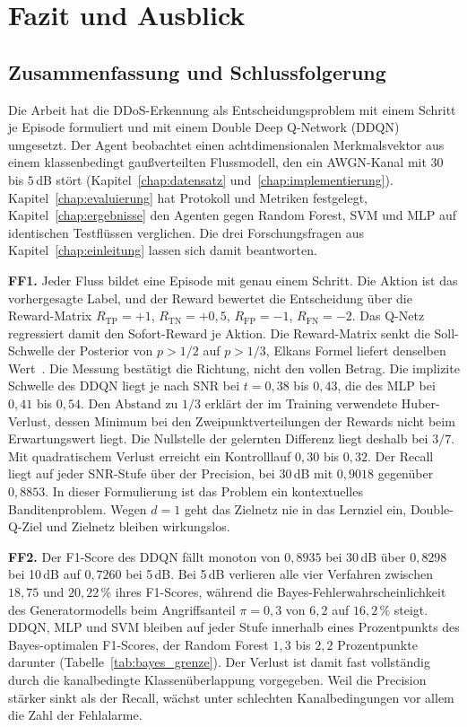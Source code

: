 \chapter{Fazit und Ausblick}
\label{chap:fazit}

\section{Zusammenfassung und Schlussfolgerung}
\label{sec:fazit_zusammenfassung}

Die Arbeit hat die DDoS-Erkennung als Entscheidungsproblem mit einem Schritt je Episode formuliert und mit einem Double Deep Q-Network (DDQN) umgesetzt. Der Agent beobachtet einen achtdimensionalen Merkmalsvektor aus einem klassenbedingt gaußverteilten Flussmodell, den ein AWGN-Kanal mit $30$ bis $5$\,dB stört (Kapitel~\ref{chap:datensatz} und~\ref{chap:implementierung}). Kapitel~\ref{chap:evaluierung} hat Protokoll und Metriken festgelegt, Kapitel~\ref{chap:ergebnisse} den Agenten gegen Random Forest, SVM und MLP auf identischen Testflüssen verglichen. Die drei Forschungsfragen aus Kapitel~\ref{chap:einleitung} lassen sich damit beantworten.

\textbf{FF1.} Jeder Fluss bildet eine Episode mit genau einem Schritt. Die Aktion ist das vorhergesagte Label, und der Reward bewertet die Entscheidung über die Reward-Matrix $R_{\mathrm{TP}}=+1$, $R_{\mathrm{TN}}=+0{,}5$, $R_{\mathrm{FP}}=-1$, $R_{\mathrm{FN}}=-2$. Das Q-Netz regressiert damit den Sofort-Reward je Aktion. Die Reward-Matrix senkt die Soll-Schwelle der Posterior von $p>1/2$ auf $p>1/3$, Elkans Formel liefert denselben Wert~\autocite{elkanFoundationsCostSensitiveLearning2001}. Die Messung bestätigt die Richtung, nicht den vollen Betrag. Die implizite Schwelle des DDQN liegt je nach SNR bei $t=0{,}38$ bis $0{,}43$, die des MLP bei $0{,}41$ bis $0{,}54$. Den Abstand zu $1/3$ erklärt der im Training verwendete Huber-Verlust, dessen Minimum bei den Zweipunktverteilungen der Rewards nicht beim Erwartungswert liegt. Die Nullstelle der gelernten Differenz liegt deshalb bei $3/7$. Mit quadratischem Verlust erreicht ein Kontrolllauf $0{,}30$ bis $0{,}32$. Der Recall liegt auf jeder SNR-Stufe über der Precision, bei 30\,dB mit $0{,}9018$ gegenüber $0{,}8853$. In dieser Formulierung ist das Problem ein kontextuelles Banditenproblem. Wegen $d=1$ geht das Zielnetz nie in das Lernziel ein, Double-Q-Ziel und Zielnetz bleiben wirkungslos.

\textbf{FF2.} Der F1-Score des DDQN fällt monoton von $0{,}8935$ bei 30\,dB über $0{,}8298$ bei 10\,dB auf $0{,}7260$ bei 5\,dB. Bei 5\,dB verlieren alle vier Verfahren zwischen $18{,}75$ und $20{,}22\,\%$ ihres F1-Scores, während die Bayes-Fehlerwahrscheinlichkeit des Generatormodells beim Angriffsanteil $\pi=0{,}3$ von $6{,}2$ auf $16{,}2\,\%$ steigt. DDQN, MLP und SVM bleiben auf jeder Stufe innerhalb eines Prozentpunkts des Bayes-optimalen F1-Scores, der Random Forest $1{,}3$ bis $2{,}2$ Prozentpunkte darunter (Tabelle~\ref{tab:bayes_grenze}). Der Verlust ist damit fast vollständig durch die kanalbedingte Klassenüberlappung vorgegeben. Weil die Precision stärker sinkt als der Recall, wächst unter schlechten Kanalbedingungen vor allem die Zahl der Fehlalarme.

